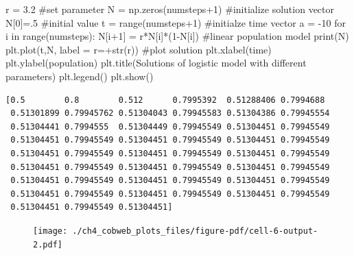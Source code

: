 \documentclass[
  letterpaper,
  DIV=11,
  numbers=noendperiod]{scrreprt}
\newenvironment{Shaded}{\begin{snugshade}}{\end{snugshade}}
\newcommand{\BuiltInTok}[1]{\textcolor[rgb]{0.00,0.23,0.31}{#1}}
\newcommand{\CommentTok}[1]{\textcolor[rgb]{0.37,0.37,0.37}{#1}}
\newcommand{\ControlFlowTok}[1]{\textcolor[rgb]{0.00,0.23,0.31}{#1}}
\newcommand{\DecValTok}[1]{\textcolor[rgb]{0.68,0.00,0.00}{#1}}
\newcommand{\FloatTok}[1]{\textcolor[rgb]{0.68,0.00,0.00}{#1}}
\newcommand{\KeywordTok}[1]{\textcolor[rgb]{0.00,0.23,0.31}{#1}}
\newcommand{\NormalTok}[1]{\textcolor[rgb]{0.00,0.23,0.31}{#1}}
\newcommand{\OperatorTok}[1]{\textcolor[rgb]{0.37,0.37,0.37}{#1}}
\newcommand{\StringTok}[1]{\textcolor[rgb]{0.13,0.47,0.30}{#1}}
\begin{document}
\begin{Shaded}
\begin{Highlighting}[]
\NormalTok{r }\OperatorTok{=} \FloatTok{3.2} \CommentTok{\#set parameter}
\NormalTok{N }\OperatorTok{=}\NormalTok{ np.zeros(numsteps}\OperatorTok{+}\DecValTok{1}\NormalTok{) }\CommentTok{\#initialize solution vector}
\NormalTok{N[}\DecValTok{0}\NormalTok{]}\OperatorTok{=}\FloatTok{.5} \CommentTok{\#initial value}
\NormalTok{t }\OperatorTok{=} \BuiltInTok{range}\NormalTok{(numsteps}\OperatorTok{+}\DecValTok{1}\NormalTok{) }\CommentTok{\#initialze time vector}
\NormalTok{a }\OperatorTok{=} \OperatorTok{{-}}\DecValTok{10}
\ControlFlowTok{for}\NormalTok{ i }\KeywordTok{in} \BuiltInTok{range}\NormalTok{(numsteps):}
\NormalTok{    N[i}\OperatorTok{+}\DecValTok{1}\NormalTok{] }\OperatorTok{=}\NormalTok{ r}\OperatorTok{*}\NormalTok{N[i]}\OperatorTok{*}\NormalTok{(}\DecValTok{1}\OperatorTok{{-}}\NormalTok{N[i]) }\CommentTok{\#linear population model}
\BuiltInTok{print}\NormalTok{(N)}
\NormalTok{plt.plot(t,N, label }\OperatorTok{=} \StringTok{\textquotesingle{}r=\textquotesingle{}}\OperatorTok{+}\BuiltInTok{str}\NormalTok{(r)) }\CommentTok{\#plot solution}
\NormalTok{plt.xlabel(}\StringTok{\textquotesingle{}time\textquotesingle{}}\NormalTok{)}
\NormalTok{plt.ylabel(}\StringTok{\textquotesingle{}population\textquotesingle{}}\NormalTok{)}
\NormalTok{plt.title(}\StringTok{\textquotesingle{}Solutions of logistic model with different parameters\textquotesingle{}}\NormalTok{)}
\NormalTok{plt.legend()}
\NormalTok{plt.show()}
\end{Highlighting}
\end{Shaded}

\begin{verbatim}
[0.5        0.8        0.512      0.7995392  0.51288406 0.7994688
 0.51301899 0.79945762 0.51304043 0.79945583 0.51304386 0.79945554
 0.51304441 0.7994555  0.51304449 0.79945549 0.51304451 0.79945549
 0.51304451 0.79945549 0.51304451 0.79945549 0.51304451 0.79945549
 0.51304451 0.79945549 0.51304451 0.79945549 0.51304451 0.79945549
 0.51304451 0.79945549 0.51304451 0.79945549 0.51304451 0.79945549
 0.51304451 0.79945549 0.51304451 0.79945549 0.51304451 0.79945549
 0.51304451 0.79945549 0.51304451 0.79945549 0.51304451 0.79945549
 0.51304451 0.79945549 0.51304451]
\end{verbatim}

\begin{figure}[H]

{\centering \texttt{[image: ./ch4\_cobweb\_plots\_files/figure-pdf/cell-6-output-2.pdf]}

}

\end{figure}
\end{document}
